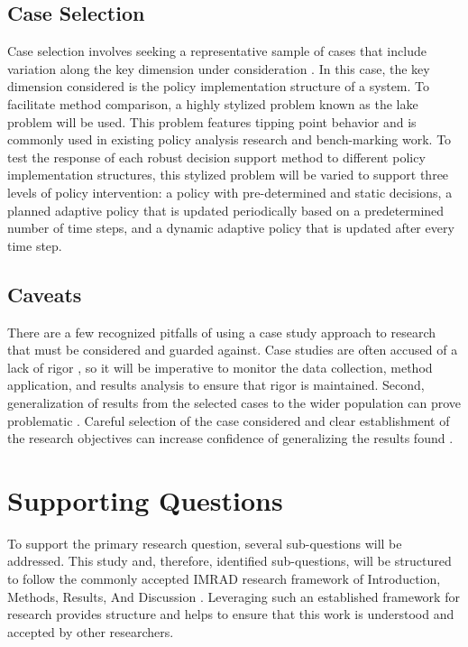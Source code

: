     \subsection{Case Selection}
    Case selection involves seeking a representative sample of cases that include variation along the key dimension under consideration \citep{Seawright2008}. In this case, the key dimension considered is the policy implementation structure of a system. To facilitate method comparison, a highly stylized problem known as the lake problem will be used. This problem features tipping point behavior and is commonly used in existing policy analysis research and bench-marking work. To test the response of each robust decision support method to different policy implementation structures, this stylized problem will be varied to support three levels of policy intervention: a policy with pre-determined and static decisions, a planned adaptive policy that is updated periodically based on a predetermined number of time steps, and a dynamic adaptive policy that is updated after every time step. 

    \subsection{Caveats}
    There are a few recognized pitfalls of using a case study approach to research that must be considered and guarded against. Case studies are often accused of a lack of rigor \citep{Yin2012}, so it will be imperative to monitor the data collection, method application, and results analysis to ensure that rigor is maintained. Second, generalization of results from the selected cases to the wider population can prove problematic \citep{Zainal2007}. Careful selection of the case considered and clear establishment of the research objectives can increase confidence of generalizing the results found \citep{Seawright2008, Yin2012}.

\section{Supporting Questions} \label{def-supporting-questions}
To support the primary research question, several sub-questions will be addressed. This study and, therefore, identified sub-questions, will be structured to follow the commonly accepted IMRAD research framework of Introduction, Methods, Results, And Discussion \citep{Nair2014}. Leveraging such an established framework for research provides structure and helps to ensure that this work is understood and accepted by other researchers.

